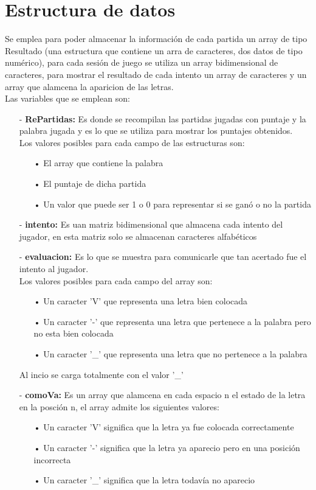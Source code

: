 \documentclass[oneside]{article}
\begin{document}
	\section*{Estructura de datos}
	Se emplea para poder almacenar la información de cada partida un array de tipo Resultado (una estructura que contiene un arra de caracteres, dos datos de tipo numérico), para cada sesión de juego se utiliza un array bidimensional de caracteres, para mostrar el resultado de cada intento un array de caracteres y un array que alamcena la aparicion de las letras.\\
	Las variables que se emplean son:
	\begin{itemize}
	\item[-]\textbf{RePartidas:} Es donde se recompilan las partidas jugadas con puntaje y la palabra jugada y es lo que se utiliza para mostrar los puntajes obtenidos.\\Los valores posibles para cada campo de las estructuras son:
		\begin{itemize}
		\item[•] El array que contiene la palabra
		\item[•] El puntaje de dicha partida
		\item[•] Un valor que puede ser 1 o 0 para representar si se ganó o no la partida
		\end{itemize}
	\item[-]\textbf{intento:} Es uan matriz bidimensional que almacena cada intento del jugador, en esta matriz solo se almacenan caracteres alfabéticos
	\item[-]\textbf{evaluacion:} Es lo que se muestra para comunicarle que tan acertado fue el intento al jugador.\\Los valores posibles para cada campo del array son:
		\begin{itemize}
		\item[•] Un caracter 'V' que representa una letra bien colocada
		\item[•] Un caracter '-' que representa una letra que pertenece a la palabra pero no esta bien colocada
		\item[•] Un caracter '\_' que representa una letra que no pertenece a la palabra
		\end{itemize}
		Al incio se carga totalmente con el valor '\_'
	\item[-]\textbf{comoVa:} Es un array que alamcena en cada espacio n el estado de la letra en la posción n, el array admite los siguientes valores:
		\begin{itemize}
		\item[•] Un caracter 'V' significa que la letra ya fue colocada correctamente
		\item[•] Un caracter '-' significa que la letra ya aparecio pero en una posición incorrecta
		\item[•] Un caracter '\_' significa que la letra todavía no aparecio
		\end{itemize}
	\end{itemize}
\end{document}
